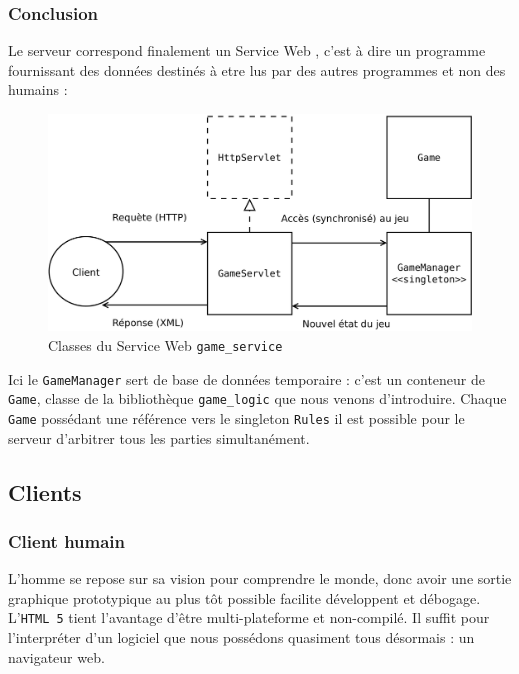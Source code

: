 \subsubsection{Conclusion}
Le serveur correspond finalement un \og Service Web \fg{}, c'est à dire un programme fournissant des données destinés à etre lus par des autres programmes et non des humains :
\begin{figure}[H] 
\centering
\includegraphics[width=\textwidth]{files/env/game_service} 
\caption{Classes du Service Web \texttt{game\_service}} 
\label{game_service}
\end{figure}
Ici le \texttt{GameManager} sert de base de données temporaire : c'est un conteneur de \texttt{Game}, classe de la bibliothèque \texttt{game\_logic} que nous venons d'introduire. Chaque \texttt{Game} possédant une référence vers le singleton \texttt{Rules} il est possible pour le serveur d'arbitrer tous les parties simultanément.

\subsection{Clients}
\subsubsection{Client humain}
L'homme se repose sur sa vision pour comprendre le monde, donc avoir une sortie graphique prototypique au plus tôt possible facilite développent et débogage. L'\texttt{HTML 5} tient l'avantage d'être multi-plateforme et non-compilé. Il suffit pour l'interpréter d'un logiciel que nous possédons quasiment tous désormais : un navigateur web.  

